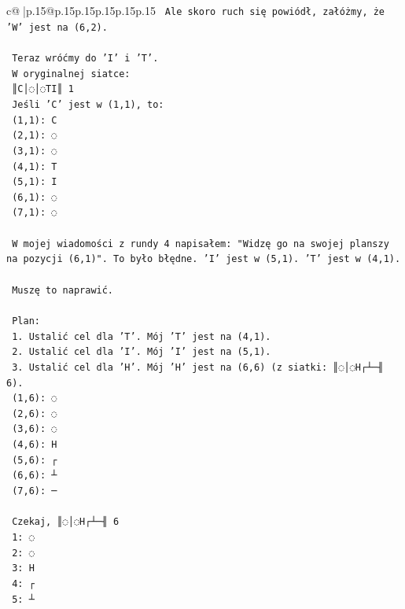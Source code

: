 \documentclass{article}
\begin{document}
{\begin{supertabular}{c@{$\;$}|p{.15\linewidth}@{}p{.15\linewidth}p{.15\linewidth}p{.15\linewidth}p{.15\linewidth}p{.15\linewidth}}
{{{\texttt{   Ale skoro ruch się powiódł, załóżmy, że 'W' jest na (6,2).} \\
\\ 
\texttt{   Teraz wróćmy do 'I' i 'T'.} \\
\texttt{   W oryginalnej siatce:} \\
\texttt{   ║C│◌│◌TI║ 1} \\
\texttt{   Jeśli 'C' jest w (1,1), to:} \\
\texttt{   (1,1): C} \\
\texttt{   (2,1): ◌} \\
\texttt{   (3,1): ◌} \\
\texttt{   (4,1): T} \\
\texttt{   (5,1): I} \\
\texttt{   (6,1): ◌} \\
\texttt{   (7,1): ◌} \\
\\ 
\texttt{   W mojej wiadomości z rundy 4 napisałem: "Widzę go na swojej planszy na pozycji (6,1)". To było błędne. 'I' jest w (5,1). 'T' jest w (4,1).} \\
\\ 
\texttt{   Muszę to naprawić.} \\
\\ 
\texttt{   Plan:} \\
\texttt{   1. Ustalić cel dla 'T'. Mój 'T' jest na (4,1).} \\
\texttt{   2. Ustalić cel dla 'I'. Mój 'I' jest na (5,1).} \\
\texttt{   3. Ustalić cel dla 'H'. Mój 'H' jest na (6,6) (z siatki: ║◌│◌H┌┴─╢ 6).} \\
\texttt{      (1,6): ◌} \\
\texttt{      (2,6): ◌} \\
\texttt{      (3,6): ◌} \\
\texttt{      (4,6): H} \\
\texttt{      (5,6): ┌} \\
\texttt{      (6,6): ┴} \\
\texttt{      (7,6): ─} \\
\\ 
\texttt{      Czekaj, ║◌│◌H┌┴─╢ 6} \\
\texttt{      1: ◌} \\
\texttt{      2: ◌} \\
\texttt{      3: H} \\
\texttt{      4: ┌} \\
\texttt{      5: ┴} \\
}}}
\end{supertabular}}
\end{document}
